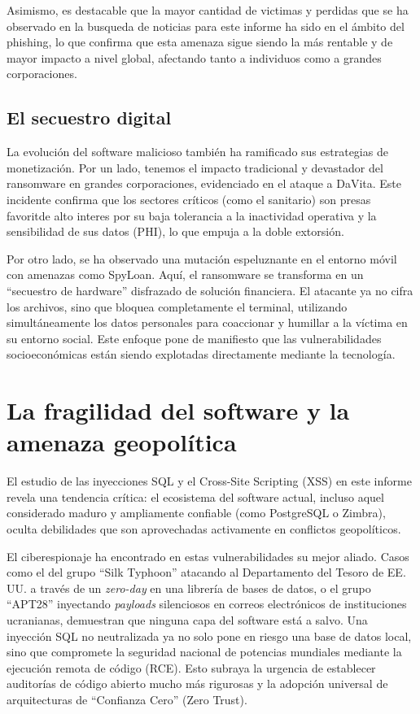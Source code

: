 Asimismo, es destacable que la mayor cantidad de victimas y perdidas que se ha observado en la busqueda de noticias para este informe ha sido en el ámbito del phishing, lo que confirma que esta amenaza sigue siendo la más rentable y de mayor impacto a nivel global, afectando tanto a individuos como a grandes corporaciones.

\subsection{El secuestro digital}
La evolución del software malicioso también ha ramificado sus estrategias de monetización. Por un lado, tenemos el impacto tradicional y devastador del ransomware en grandes corporaciones, evidenciado en el ataque a DaVita. Este incidente confirma que los sectores críticos (como el sanitario) son presas favoritde alto interes por su baja tolerancia a la inactividad operativa y la sensibilidad de sus datos (PHI), lo que empuja a la doble extorsión.

Por otro lado, se ha observado una mutación espeluznante en el entorno móvil con amenazas como SpyLoan. Aquí, el ransomware se transforma en un ``secuestro de hardware'' disfrazado de solución financiera. El atacante ya no cifra los archivos, sino que bloquea completamente el terminal, utilizando simultáneamente los datos personales para coaccionar y humillar a la víctima en su entorno social. Este enfoque pone de manifiesto que las vulnerabilidades socioeconómicas están siendo explotadas directamente mediante la tecnología.

\section{La fragilidad del software y la amenaza geopolítica}
El estudio de las inyecciones SQL y el Cross-Site Scripting (XSS) en este informe revela una tendencia crítica: el ecosistema del software actual, incluso aquel considerado maduro y ampliamente confiable (como PostgreSQL o Zimbra), oculta debilidades que son aprovechadas activamente en conflictos geopolíticos.

El ciberespionaje ha encontrado en estas vulnerabilidades su mejor aliado. Casos como el del grupo ``Silk Typhoon'' atacando al Departamento del Tesoro de EE. UU. a través de un \textit{zero-day} en una librería de bases de datos, o el grupo ``APT28'' inyectando \textit{payloads} silenciosos en correos electrónicos de instituciones ucranianas, demuestran que ninguna capa del software está a salvo. Una inyección SQL no neutralizada ya no solo pone en riesgo una base de datos local, sino que compromete la seguridad nacional de potencias mundiales mediante la ejecución remota de código (RCE). Esto subraya la urgencia de establecer auditorías de código abierto mucho más rigurosas y la adopción universal de arquitecturas de ``Confianza Cero'' (Zero Trust).

